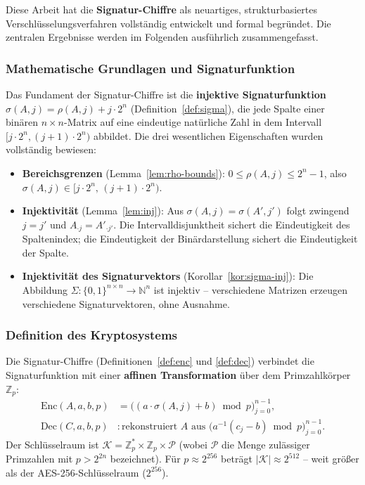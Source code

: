 ﻿\documentclass[a4paper,12pt]{scrreprt}
\theoremstyle{definition}
\begin{document}
Diese Arbeit hat die \textbf{Signatur-Chiffre} als neuartiges, strukturbasiertes Verschlüsselungsverfahren vollständig entwickelt und formal begründet. Die zentralen Ergebnisse werden im Folgenden ausführlich zusammengefasst.

\subsubsection{Mathematische Grundlagen und Signaturfunktion}

Das Fundament der Signatur-Chiffre ist die \textbf{injektive Signaturfunktion} $\sigma(A,j) = \rho(A,j) + j \cdot 2^n$ (Definition~\ref{def:sigma}), die jede Spalte einer binären $n \times n$-Matrix auf eine eindeutige natürliche Zahl in dem Intervall $[j \cdot 2^n, (j+1) \cdot 2^n)$ abbildet. Die drei wesentlichen Eigenschaften wurden vollständig bewiesen:

\begin{itemize}
  \item \textbf{Bereichsgrenzen} (Lemma~\ref{lem:rho-bounds}): $0 \leq \rho(A,j) \leq 2^n - 1$, also $\sigma(A,j) \in [j \cdot 2^n,\, (j+1) \cdot 2^n)$.
  \item \textbf{Injektivität} (Lemma~\ref{lem:inj}): Aus $\sigma(A,j) = \sigma(A',j')$ folgt zwingend $j = j'$ und $A_{\cdot j} = A'_{\cdot j'}$. Die Intervalldisjunktheit sichert die Eindeutigkeit des Spaltenindex; die Eindeutigkeit der Binärdarstellung sichert die Eindeutigkeit der Spalte.
  \item \textbf{Injektivität des Signaturvektors} (Korollar~\ref{kor:sigma-inj}): Die Abbildung $\Sigma: \{0,1\}^{n \times n} \to \mathbb{N}^n$ ist injektiv -- verschiedene Matrizen erzeugen verschiedene Signaturvektoren, ohne Ausnahme.
\end{itemize}

\subsubsection{Definition des Kryptosystems}

Die Signatur-Chiffre (Definitionen~\ref{def:enc} und \ref{def:dec}) verbindet die Signaturfunktion mit einer \textbf{affinen Transformation} über dem Primzahlkörper $\mathbb{Z}_p$:
\begin{align*}
\mathrm{Enc}(A, a, b, p) &= \bigl((a \cdot \sigma(A,j) + b) \bmod p\bigr)_{j=0}^{n-1}, \\
\mathrm{Dec}(C, a, b, p) &: \text{rekonstruiert } A \text{ aus } \bigl(a^{-1}(c_j - b) \bmod p\bigr)_{j=0}^{n-1}.
\end{align*}
Der Schlüsselraum ist $\mathcal{K} = \mathbb{Z}_p^* \times \mathbb{Z}_p \times \mathcal{P}$ (wobei $\mathcal{P}$ die Menge zulässiger Primzahlen mit $p > 2^{2n}$ bezeichnet). Für $p \approx 2^{256}$ beträgt $|\mathcal{K}| \approx 2^{512}$ -- weit größer als der AES-256-Schlüsselraum ($2^{256}$).
\end{document}

